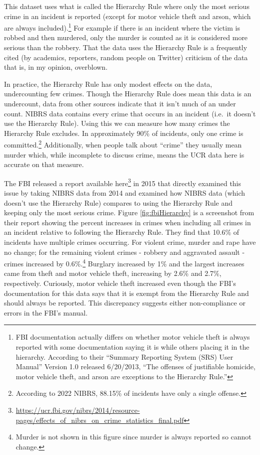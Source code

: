 \documentclass[
]{krantz}
\renewcommand{\href}[2]{#2\footnote{\url{#1}}}
\begin{document}
This dataset uses what is called the Hierarchy Rule where
only the most serious crime in an incident is reported
(except for motor vehicle theft and arson, which are always
included).\footnote{FBI documentation actually differs on
  whether motor vehicle theft is always reported with some
  documentation saying it is while others placing it in the
  hierarchy. According to their ``Summary Reporting System
  (SRS) User Manual'' Version 1.0 released 6/20/2013, ``The
  offenses of justifiable homicide, motor vehicle theft, and
  arson are exceptions to the Hierarchy Rule.''} For example
if there is an incident where the victim is robbed and then
murdered, only the murder is counted as it is considered
more serious than the robbery. That the data uses the
Hierarchy Rule is a frequently cited (by academics,
reporters, random people on Twitter) criticism of the data
that is, in my opinion, overblown.

In practice, the Hierarchy Rule has only modest effects on
the data, undercounting few crimes. Though the Hierarchy
Rule does mean this data is an undercount, data from other
sources indicate that it isn't much of an under count. NIBRS
data contains every crime that occurs in an incident
(i.e.~it doesn't use the Hierarchy Rule). Using this we can
measure how many crimes the Hierarchy Rule excludes. In
approximately 90\% of incidents, only one crime is
committed.\footnote{According to 2022 NIBRS, 88.15\% of
  incidents have only a single offense.} Additionally, when
people talk about ``crime'' they usually mean murder which,
while incomplete to discuss crime, means the UCR data here
is accurate on that measure.

The FBI released a report
\href{https://ucr.fbi.gov/nibrs/2014/resource-pages/effects_of_nibrs_on_crime_statistics_final.pdf}{available
here} in 2015 that directly examined this issue by taking
NIBRS data from 2014 and examined how NIBRS data (which
doesn't use the Hierarchy Rule) compares to using the
Hierarchy Rule and keeping only the most serious crime.
Figure \ref{fig:fbiHierarchy} is a screenshot from their
report showing the percent increases in crimes when
including all crimes in an incident relative to following
the Hierarchy Rule. They find that 10.6\% of incidents have
multiple crimes occurring. For violent crime, murder and
rape have no change; for the remaining violent crimes -
robbery and aggravated assault - crimes increased by
0.6\%.\footnote{Murder is not shown in this figure since
  murder is always reported so cannot change.} Burglary
increased by 1\% and the largest increases came from theft
and motor vehicle theft, increasing by 2.6\% and 2.7\%,
respectively. Curiously, motor vehicle theft increased even
though the FBI's documentation for this data says that it is
exempt from the Hierarchy Rule and should always be
reported. This discrepancy suggests either non-compliance or
errors in the FBI's manual.
\end{document}
